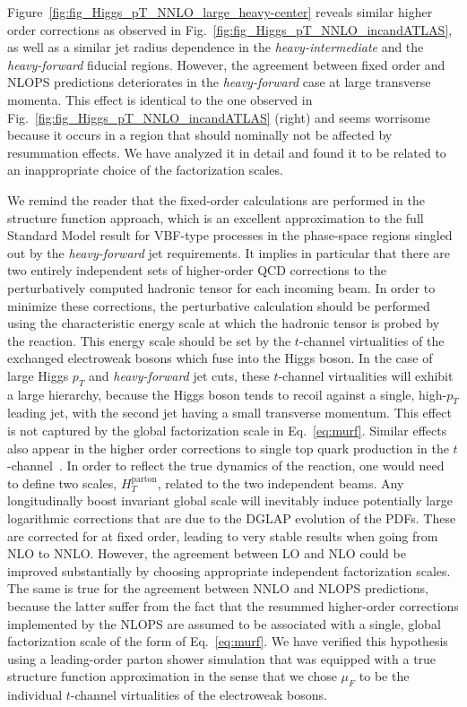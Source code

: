 \documentclass[10pt,prd,fleqn,superscriptaddress,notitlepage,nofootinbib,preprintnumbers,nobalancelastpage]{revtex4-1}
\begin{document}
Figure~\ref{fig:fig_Higgs_pT_NNLO_large_heavy-center} reveals similar higher order corrections as observed in  Fig.~\ref{fig:fig_Higgs_pT_NNLO_incandATLAS}, as well as a similar jet radius dependence in the \textit{heavy-intermediate} and the \textit{heavy-forward} fiducial regions. However, the agreement between fixed order and NLOPS predictions deteriorates in the \textit{heavy-forward} case at large transverse momenta. This effect is identical to the one observed in Fig.~\ref{fig:fig_Higgs_pT_NNLO_incandATLAS} (right) and seems worrisome because it occurs in a region that should nominally not be affected by resummation effects. We have analyzed it in detail and found it to be related to an inappropriate choice of the factorization scales.

We remind the reader that the fixed-order calculations are performed in the structure function approach, which is an excellent approximation to the full Standard Model result for VBF-type processes in the phase-space regions singled out by the \textit{heavy-forward} jet requirements. It implies in particular that there are two entirely independent sets of higher-order QCD corrections to the perturbatively computed hadronic tensor for each incoming beam. In order to minimize these corrections, the perturbative calculation should be performed using the characteristic energy scale at which the hadronic tensor is probed by the reaction. This energy scale should be set by the $t$-channel virtualities of the exchanged electroweak bosons which fuse into the Higgs boson. In the case of large Higgs $p_T$ and \textit{heavy-forward} jet cuts, these $t$-channel virtualities will exhibit a large hierarchy, because the Higgs boson tends to recoil against a single, high-$p_T$ leading jet, with the second jet having a small transverse momentum. This effect is not captured by the global factorization scale in Eq.~\eqref{eq:murf}. Similar effects also appear in the higher order corrections to single top quark production in the $t$-channel~\cite{Campbell:2020fhf}. In order to reflect the true dynamics of the reaction, one would need to define two scales, $H_T^{\text{parton}}$, related to the two independent beams. Any longitudinally boost invariant global scale will inevitably induce potentially large logarithmic corrections that are due to the DGLAP evolution of the PDFs. These are corrected for at fixed order, leading to very stable results when going from NLO to NNLO. However, the agreement between LO and NLO could be improved substantially by choosing appropriate independent factorization scales. The same is true for the agreement between NNLO and NLOPS predictions, because the latter suffer from the fact that the resummed higher-order corrections implemented by the NLOPS are assumed to be associated with a single, global factorization scale of the form of Eq.~\eqref{eq:murf}. We have verified this hypothesis using a leading-order parton shower simulation that was equipped with a true structure function approximation in the sense that we chose $\mu_F$ to be the individual $t$-channel virtualities of the electroweak bosons.
\end{document}
